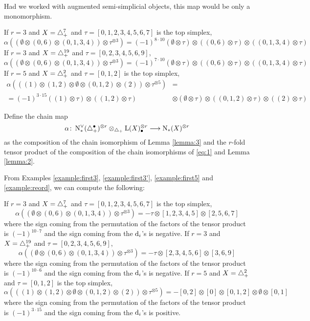 \begin{remark}
	Had we worked with augmented semi-simplicial objects, this map would be only a monomorphism.
\end{remark}
\begin{example}\label{example:reord} If $r=3$ and $X=\triangle_{+}^7$ and $\tau = [0,1,2,3,4,5,6,7]$ is the top simplex,
\[
		\alpha((\emptyset\otimes (0,6)\otimes (0,1,3,4))\otimes \tau^{\otimes 3}) = (-1)^{8\cdot 10}(\emptyset\otimes \tau)\otimes ((0,6)\otimes \tau)\otimes ((0,1,3,4)\otimes \tau)
	\]
 If $r=3$ and $X=\triangle_{+}^{19}$ and $\tau = [0,2,3,4,5,6,9]$,
\[
		\alpha((\emptyset\otimes (0,6)\otimes (0,1,3,4))\otimes \tau^{\otimes 3}) = (-1)^{7\cdot 10}(\emptyset\otimes \tau)\otimes ((0,6)\otimes \tau)\otimes ((0,1,3,4)\otimes \tau)
	\]
 If $r=5$ and $X=\triangle_{+}^2$ and $\tau = [0,1,2]$ is the top simplex,
	\[
	\begin{split}
		\alpha(((1)\otimes (1,2)\otimes \emptyset\otimes (0,1,2)\otimes (2))\otimes \tau^{\otimes 5}) &=
		\\
		=(-1)^{3\cdot 15}((1)\otimes \tau) \otimes ((1,2)\otimes \tau)&\otimes (\emptyset\otimes \tau)\otimes ((0,1,2)\otimes \tau)\otimes ((2)\otimes \tau)
		\end{split}
	\]
	\end{example}

\begin{definition} Define the chain map
	\[\alpha\colon \operatorname{N}^\vee_{*}(\triangle_{+}^\bullet)^{\otimes r}\otimes_{\triangle_{+}} \operatorname{L}(X)_\bullet^{\otimes r}\longrightarrow \operatorname{N}_{*}(X)^{\otimes r}\]
as the composition of the chain isomorphism of Lemma \ref{lemma:3} and the $r$-fold tensor product of the composition of the chain isomorphisms of \eqref{eq:1} and Lemma \ref{lemma:2}.
\end{definition}


From Examples \ref{example:first3}, \ref{example:first3'}, \ref{example:first5} and \ref{example:reord}, we can compute the following:
\begin{example}\label{example:alpha} If $r=3$ and $X=\triangle_{+}^7$ and $\tau = [0,1,2,3,4,5,6,7]$ is the top simplex,
\[
		\alpha((\emptyset\otimes (0,6)\otimes (0,1,3,4))\otimes \tau^{\otimes 3}) = -\tau\otimes [1,2,3,4,5]\otimes [2,5,6,7]
	\]
	where the sign coming from the permutation of the factors of the tensor product is $(-1)^{10\cdot 7}$ and the sign coming from the $\operatorname{d}_i$'s is negative. If $r=3$ and $X=\triangle_{+}^{19}$ and $\tau = [0,2,3,4,5,6,9]$,
\[
		\alpha((\emptyset\otimes (0,6)\otimes (0,1,3,4))\otimes \tau^{\otimes 3}) = -\tau\otimes [2,3,4,5,6]\otimes [3,6,9]
	\]
	where the sign coming from the permutation of the factors of the tensor product is $(-1)^{10\cdot 6}$ and the sign coming from the $\operatorname{d}_i$'s is negative. If $r=5$ and $X=\triangle_{+}^2$ and $\tau = [0,1,2]$ is the top simplex,
	\[
		\alpha(((1)\otimes (1,2)\otimes \emptyset\otimes (0,1,2)\otimes (2))\otimes \tau^{\otimes 5}) = -[0,2]\otimes [0]\otimes [0,1,2]\otimes \emptyset\otimes [0,1]
	\]
		where the sign coming from the permutation of the factors of the tensor product is $(-1)^{3\cdot 15}$ and the sign coming from the $\operatorname{d}_i$'s is positive.
	\end{example}

